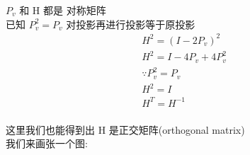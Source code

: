 \documentclass[12pt]{article}
\begin{document}
\begin{flushleft}
    $P_{v}$ 和 H 都是 对称矩阵 \\

    已知 $P_{v}^{2} = P_{v}$ 对投影再进行投影等于原投影 \\
    \begin{align}
        H^{2} = (I  - 2P_{v})^{2}       \\
        H^{2} = I - 4P_{v} + 4P_{v}^{2} \\
        \because  P_{v}^{2} = P_{v}     \\
        H^{2} = I                       \\
        H^{T} = H^{-1}                  \\
    \end{align}

    这里我们也能得到出 H 是正交矩阵(orthogonal matrix) \\

    我们来画张一个图: \\
    \begin{figure}[htbp]
        \centering
\end{figure}
\end{flushleft}
\end{document}
